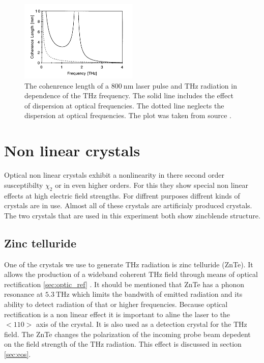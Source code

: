 \begin{figure}
    \centering
    \includegraphics[width=0.5\textwidth]{refferenced_pic/coherence_length_ZnTe.png}
    \caption{The cohenrence length of a $\SI{800}{\nano\meter}$ laser pulse and $\si{\tera\hertz}$ radiation in dependence of the $\si{\tera\hertz}$ frequency.
    The solid line includes the effect of dispersion at optical frequencies. The dotted line neglects the dispersion at optical frequencies.
    The plot was taken from source \cite{coherence_legnth}.}
    \label{fig:coherence_legnth}
\end{figure}

\FloatBarrier
\section{Non linear crystals}
Optical non linear crystals exhibit a nonlinearity in there second order susceptibilty $\chi_2$ or in even higher orders.
For this they show special non linear effects at high electric field strengths.
For diffrent purposes diffrent kinds of crystals are in use.
Almost all of these crystals are artificialy produced crystals.
The two crystals that are used in this experiment both show zincblende structure.


\subsection{Zinc telluride}
One of the crystals we use to generate $\si{\tera\hertz}$ radiation is zinc telluride (ZnTe). 
It allows the production of a wideband coherent $\si{\tera\hertz}$ field through means of optical rectification \ref{sec:optic_ref} \cite{ZnTe_Nahata_Weling_1996}.
It should be mentioned that ZnTe has a phonon resonance at $\SI{5.3}{\tera\hertz}$ \cite{phonon_modes} which limits the bandwith of emitted radiation and its ability to detect radiation of that or higher frequencies.
Because optical rectification is a non linear effect it is important to aline the laser to the $<110>$ axis of the crystal.
It is also used as a detection crystal for the $\si{\tera\hertz}$ field.
The ZnTe changes the polarization of the incoming probe beam depedent on the field strength of the $\si{\tera\hertz}$ radiation.
This effect is discussed in section \ref{sec:eos}.

